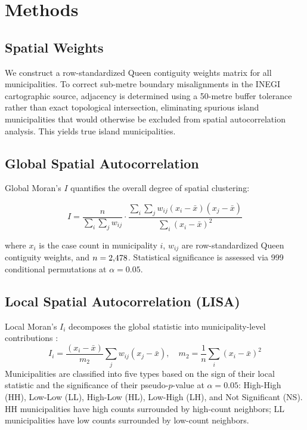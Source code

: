 \section{Methods}
\label{sec:methods}

\subsection{Spatial Weights}
\label{sec:weights}
We construct a row-standardized Queen contiguity weights matrix for all \nmunis{} municipalities.
To correct sub-metre boundary misalignments in the INEGI cartographic source, adjacency is determined using a 50-metre buffer tolerance rather than exact topological intersection, eliminating spurious island municipalities that would otherwise be excluded from spatial autocorrelation analysis.
This yields \nislands{} true island municipalities.

\subsection{Global Spatial Autocorrelation}
\label{sec:global}

Global Moran's $I$ quantifies the overall degree of spatial clustering:

\begin{equation}
  I = \frac{n}{\sum_i \sum_j w_{ij}}
      \cdot
      \frac{\sum_i \sum_j w_{ij}(x_i - \bar{x})(x_j - \bar{x})}
           {\sum_i (x_i - \bar{x})^2}
  \label{eq:moran}
\end{equation}

\noindent where $x_i$ is the case count in municipality $i$, $w_{ij}$ are row-standardized Queen contiguity weights, and $n = \text{2,478{}}$.
Statistical significance is assessed via 999 conditional permutations at $\alpha = 0.05$.

\subsection{Local Spatial Autocorrelation (LISA)}
\label{sec:lisa}
Local Moran's $I_i$ decomposes the global statistic into municipality-level contributions \citep{anselin_1995}:
\begin{equation}
  I_i = \frac{(x_i - \bar{x})}{m_2} \sum_j w_{ij}(x_j - \bar{x}), \quad
  m_2 = \frac{1}{n}\sum_i (x_i - \bar{x})^2
  \label{eq:lisa}
\end{equation}
\noindent Municipalities are classified into five types based on the sign of their local statistic and the significance of their pseudo-$p$-value at $\alpha = 0.05$: High-High (HH), Low-Low (LL), High-Low (HL), Low-High (LH), and Not Significant (NS).
HH municipalities have high counts surrounded by high-count neighbors; LL municipalities have low counts surrounded by low-count neighbors.

